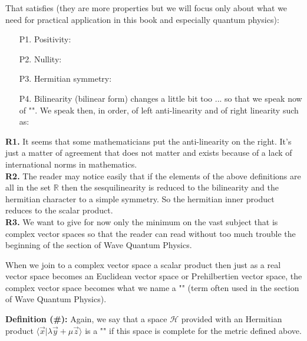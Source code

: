 	That satisfies (they are more properties but we will focus only about what we need for practical application in this book and especially quantum physics):
	\begin{enumerate}
		\item[P1.] Positivity:
		
	  	
		\item[P2.] Nullity:
		 
	  	
		\item[P3.] Hermitian symmetry:
		
	  	
	  	\item[P4.] Bilinearity (bilinear form) changes a little bit too ... so that we speak now of "". We speak then, in order, of left anti-linearity and of right linearity such as:
	  	
	\end{enumerate}
	\begin{tcolorbox}[title=Remarks,colframe=black,arc=10pt]
	\textbf{R1.} It seems that some mathematicians put the anti-linearity on the right. It's just a matter of agreement that does not matter and exists because of a lack of international norms in mathematics.\\
	
	\textbf{R2.} The reader may notice easily that if the elements of the above definitions are all in the set $\mathbb{R}$ then the sesquilinearity is reduced to the bilinearity and the hermitian character to a simple symmetry. So the hermitian inner product reduces to the scalar product.\\
	
	\textbf{R3.} We want to give for now only the minimum on the vast subject that is complex vector spaces so that the reader can read without too much trouble the beginning of the section of Wave Quantum Physics.
	\end{tcolorbox}	
	When we join to a complex vector space a scalar product then just as a real vector space becomes an Euclidean vector space or Prehilbertien vector space, the complex vector space becomes what we name a "" (term often used in the section of Wave Quantum Physics).
	
	\textbf{Definition (\#\mydef):} Again, we say that a space $\mathcal{H}$ provided with an Hermitian product $\langle \vec{x}|\lambda \vec{y} +\mu \vec{z}\rangle$ is a "" if this space is complete for the metric defined above.
	
